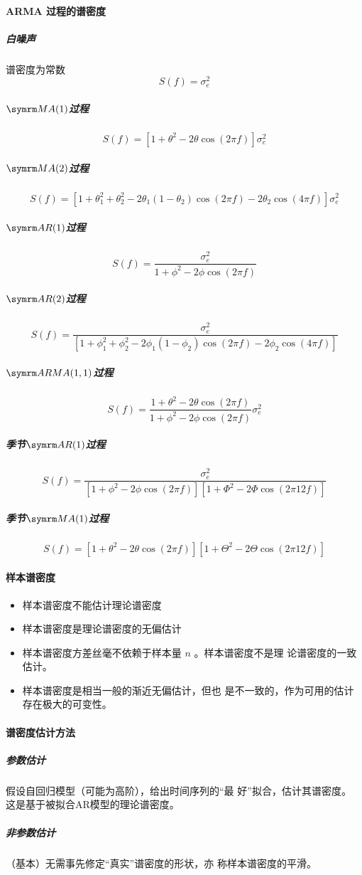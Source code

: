 \documentclass[UTF8,hyperref,a4paper,twoside]{ctexart}
\begin{document}
        \paragraph{ARMA 过程的谱密度}
        \subparagraph{白噪声} 谱密度为常数 $$ S(f) = \sigma_e^2 $$
        \subparagraph{$ \MA(1) $过程} $$ S(f) = \left[ 1 + \theta^2 - 2\theta \cos(2 \pi f) \right] \sigma_e^2 $$
        \subparagraph{$ \MA(2) $过程}
        $$ S(f) = \left[1+\theta_1^2+\theta_2^2-2\theta_1(1-\theta_2)\cos(2\pi f)-2\theta_2\cos(4\pi f)\right] \sigma_e^2 $$
        \subparagraph{$ \AR(1) $过程} $$ S(f) = \frac{\sigma_{e}^{2}}{1 + \phi^2 -2\phi \cos(2\pi f)} $$
        \subparagraph{$ \AR(2) $过程}
        $$ S(f) = \frac{\sigma_{e}^{2}}{
            \left[1+\phi_1^2+\phi_2^2-2\phi_1(1-\phi_2)\cos(2\pi f)-2\phi_2\cos(4\pi f)\right]
        } $$
        \subparagraph{$ \ARMA(1,1) $过程}
        $$ S(f) = \frac{1 + \theta^2 - 2 \theta \cos(2\pi f)}{1 + \phi^2 - 2 \phi \cos(2\pi f)} \sigma_e^2 $$
        \subparagraph{季节$ \AR(1) $过程}
        $$ S(f) = \frac{\sigma_{e}^{2}}{
            \left[1 + \phi^2 -2\phi \cos(2\pi f)\right]
            \left[1 + \Phi^2 -2\Phi \cos(2\pi 12f)\right]
        } $$
        \subparagraph{季节$ \MA(1) $过程}
        $$ S(f) = 
        \left[1 + \theta^2 -2\theta \cos(2\pi f)\right] 
        \left[1 + \Theta^2 -2\Theta \cos(2\pi 12f)\right] $$

        \paragraph{样本谱密度}
        \begin{itemize}
            \item 样本谱密度不能估计理论谱密度
            \item 样本谱密度是理论谱密度的无偏估计
            \item 样本谱密度方差丝毫不依赖于样本量 $ n $ 。样本谱密度不是理 论谱密度的一致估计。
            \item 样本谱密度是相当一般的渐近无偏估计，但也 是不一致的，作为可用的估计存在极大的可变性。
        \end{itemize}

        \paragraph{谱密度估计方法}
        \subparagraph{参数估计} 假设自回归模型（可能为高阶），给出时间序列的“最 好”拟合，估计其谱密度。
        这是基于被拟合AR模型的理论谱密度。
        \subparagraph{非参数估计} （基本）无需事先修定“真实”谱密度的形状，亦 称样本谱密度的平滑。 
\end{document}
